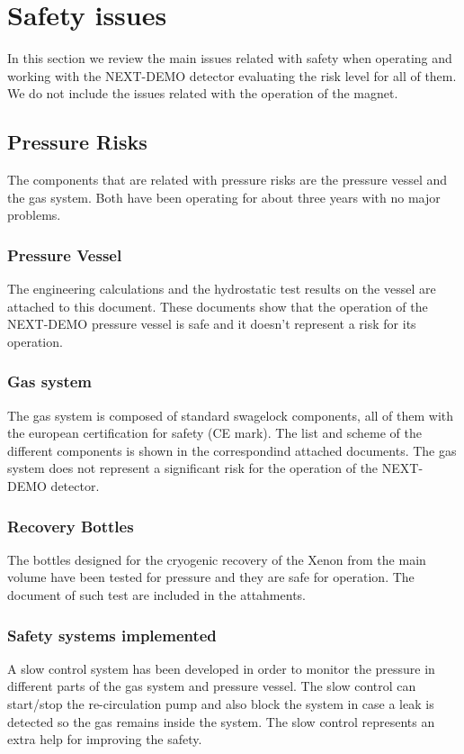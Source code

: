 \section{Safety issues}

In this section we review the main issues related with safety when operating and working with the NEXT-DEMO detector evaluating the risk level for all of them. We do not include the issues related with the operation of the magnet.

\subsection{Pressure Risks}

The components that are related with pressure risks are the pressure vessel and the gas system. Both have been operating for about three years with no major problems.

\subsubsection{Pressure Vessel}
The engineering calculations and the hydrostatic test results on the vessel are attached to this document. These documents show that the operation of the NEXT-DEMO pressure vessel is safe and it doesn't represent a risk for its operation.

\subsubsection{Gas system}
The gas system is composed of standard swagelock components, all of them with the european certification for safety (CE mark). The list and scheme of the different components is shown in the correspondind attached documents. The gas system does not represent a significant risk for the operation of the NEXT-DEMO detector.

\subsubsection{Recovery Bottles}

The bottles designed for the cryogenic recovery of the Xenon from the main volume have been tested for pressure and they are safe for operation. The document of such test are included in the attahments.


\subsubsection{Safety systems implemented}
A slow control system has been developed in order to monitor the pressure in different parts of the gas system and pressure vessel. The slow control can start/stop the re-circulation pump and also block the system in case a leak is detected so the gas remains inside the system. The slow control represents an extra help for improving the safety.

